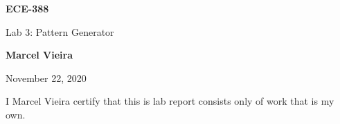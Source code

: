 \begin{titlepage}
    \begin{center}
        \vspace*{4cm}

        \Huge
        \textbf{ECE-388}
        
        \Large
        \vspace{0.5cm}
        Lab 3: Pattern Generator 
        
        \vspace{8.5cm}
        \textbf{Marcel Vieira}
    
        November 22, 2020
        
        \small
        \vspace{0.5cm}
        I Marcel Vieira certify that this is lab report consists only of work that is my own.
        
    \end{center}
\end{titlepage}